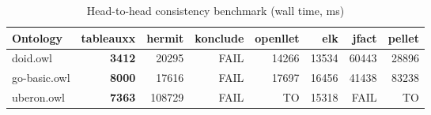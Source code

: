 \begin{table}[t]
\centering
\caption{Head-to-head consistency benchmark (wall time, ms)}
\label{tab:head_to_head_wall_ms}
\begin{tabular}{lrrrrrrr}
\toprule
Ontology & tableauxx & hermit & konclude & openllet & elk & jfact & pellet \\
\midrule
doid.owl & \textbf{3412} & 20295 & FAIL & 14266 & 13534 & 60443 & 28896 \\
go-basic.owl & \textbf{8000} & 17616 & FAIL & 17697 & 16456 & 41438 & 83238 \\
uberon.owl & \textbf{7363} & 108729 & FAIL & TO & 15318 & FAIL & TO \\
\bottomrule
\end{tabular}
\end{table}
